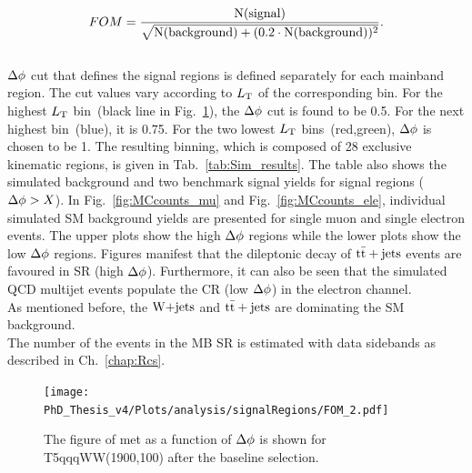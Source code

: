 \begin{equation}
    FOM = \frac{\rm N(signal)}{\rm \sqrt{N(background)+(0.2\cdot N(background))^2}}. 
\end{equation}\\
$\Delta \phi$ cut that defines the signal regions is defined separately for each mainband region. The cut values vary according to $L_{\rm T}$ of the corresponding bin. For the highest $L_{\rm T}$ bin~(black line in Fig.~\ref{fig:FOM}), the $\Delta \phi$ cut is found to be 0.5. For the next highest bin~(blue), it is 0.75. For the two lowest $L_{\rm T}$ bins~(red,green), $\Delta \phi$ is chosen to be 1.
The resulting binning, which is composed of 28 exclusive kinematic regions, is given in Tab.~\ref{tab:Sim_results}. The table also shows the simulated background and two benchmark signal yields for signal regions ($\Delta \phi>X$). In Fig.~\ref{fig:MCcounts_mu} and Fig.~\ref{fig:MCcounts_ele}, individual simulated SM background yields are presented for single muon and single electron events. The upper plots show the high $\Delta \phi$ regions while the lower plots show the low $\Delta \phi$ regions. Figures manifest that the dileptonic decay of ${\rm t\bar{t}+jets}$ events are favoured in SR (high $\Delta \phi$).
Furthermore, it can also be seen that the simulated QCD multijet events populate the CR (low $\Delta \phi$) in the electron channel.\\
As mentioned before, the $\textrm{W+jets}$ and ${\rm t\bar{t}+jets}$ are dominating the SM background.\\
The number of the events in the MB SR is estimated with data sidebands as described in Ch.~\ref{chap:Rcs}.

\begin{figure}[!h]
    \begin{center}
 \texttt{[image: PhD\_Thesis\_v4/Plots/analysis/signalRegions/FOM\_2.pdf]}
  \caption{ \label{fig:FOM} The figure of met as a function of $\Delta \phi$ is shown for T5qqqWW(1900,100) after the baseline selection.
  }
   \end{center}
\end{figure}
